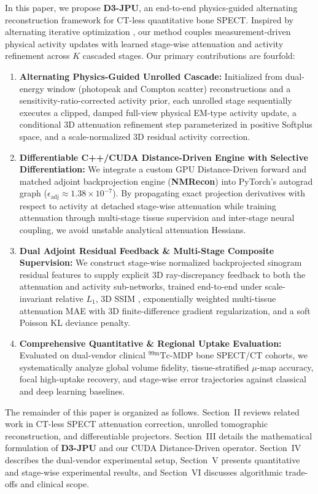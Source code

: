 \documentclass[11pt, a4paper]{article}
\begin{document}
In this paper, we propose \textbf{D3-JPU}, an end-to-end physics-guided alternating reconstruction framework for CT-less quantitative bone SPECT. Inspired by alternating iterative optimization \cite{ref12, ref24, ref25, ref26, ref27, ref28}, our method couples measurement-driven physical activity updates with learned stage-wise attenuation and activity refinement across $K$ cascaded stages. Our primary contributions are fourfold:
\begin{enumerate}
    \item \textbf{Alternating Physics-Guided Unrolled Cascade:} Initialized from dual-energy window (photopeak and Compton scatter) reconstructions and a sensitivity-ratio-corrected activity prior, each unrolled stage sequentially executes a clipped, damped full-view physical EM-type activity update, a conditional 3D attenuation refinement step parameterized in positive Softplus space, and a scale-normalized 3D residual activity correction.
    \item \textbf{Differentiable C++/CUDA Distance-Driven Engine with Selective Differentiation:} We integrate a custom GPU Distance-Driven forward and matched adjoint backprojection engine (\textbf{NMRecon}) into PyTorch's autograd graph ($\epsilon_{\text{adj}} \approx 1.38 \times 10^{-7}$). By propagating exact projection derivatives with respect to activity at detached stage-wise attenuation while training attenuation through multi-stage tissue supervision and inter-stage neural coupling, we avoid unstable analytical attenuation Hessians.
    \item \textbf{Dual Adjoint Residual Feedback \& Multi-Stage Composite Supervision:} We construct stage-wise normalized backprojected sinogram residual features to supply explicit 3D ray-discrepancy feedback to both the attenuation and activity sub-networks, trained end-to-end under scale-invariant relative $L_1$, 3D SSIM \cite{ref38}, exponentially weighted multi-tissue attenuation MAE with 3D finite-difference gradient regularization, and a soft Poisson KL deviance penalty.
    \item \textbf{Comprehensive Quantitative \& Regional Uptake Evaluation:} Evaluated on dual-vendor clinical $^{99\text{m}}\text{Tc}$-MDP bone SPECT/CT cohorts, we systematically analyze global volume fidelity, tissue-stratified $\mu$-map accuracy, focal high-uptake recovery, and stage-wise error trajectories against classical and deep learning baselines.
\end{enumerate}

The remainder of this paper is organized as follows. Section~II reviews related work in CT-less SPECT attenuation correction, unrolled tomographic reconstruction, and differentiable projectors. Section~III details the mathematical formulation of \textbf{D3-JPU} and our CUDA Distance-Driven operator. Section~IV describes the dual-vendor experimental setup, Section~V presents quantitative and stage-wise experimental results, and Section~VI discusses algorithmic trade-offs and clinical scope.
\end{document}
